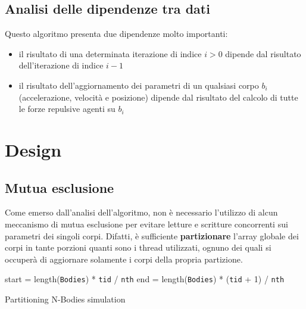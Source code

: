 \documentclass[12pt,a4paper,oneside]{article}
\begin{document}
	\subsection{Analisi delle dipendenze tra dati}
	\label{sec:dipendenze}
	Questo algoritmo presenta due dipendenze molto importanti:
	\begin{itemize}
		\item il risultato di una determinata iterazione di indice $i > 0$ dipende dal risultato dell'iterazione di indice $i-1$
		\item il risultato dell'aggiornamento dei parametri di un qualsiasi corpo $b_i$ (accelerazione, velocità e posizione) dipende dal risultato del calcolo di tutte le forze repulsive agenti su $b_i$
	\end{itemize}
	
	\section{Design}
	\subsection{Mutua esclusione}
	Come emerso dall'analisi dell'algoritmo, non è necessario l'utilizzo di alcun meccanismo di mutua esclusione per evitare letture e scritture concorrenti sui parametri dei singoli corpi. Difatti, è sufficiente \textbf{partizionare} l'array globale dei corpi in tante porzioni quanti sono i thread utilizzati, ognuno dei quali si occuperà di aggiornare solamente i corpi della propria partizione.
	
	\begin{algorithm}
		
		start = length(\texttt{Bodies}) * \texttt{tid} / \texttt{nth}\;
		end = length(\texttt{Bodies}) * (\texttt{tid} + 1) / \texttt{nth}\;
		\caption{Partitioning N-Bodies simulation}
		\label{alg:sim-partition}
	\end{algorithm}
	
\end{document}
